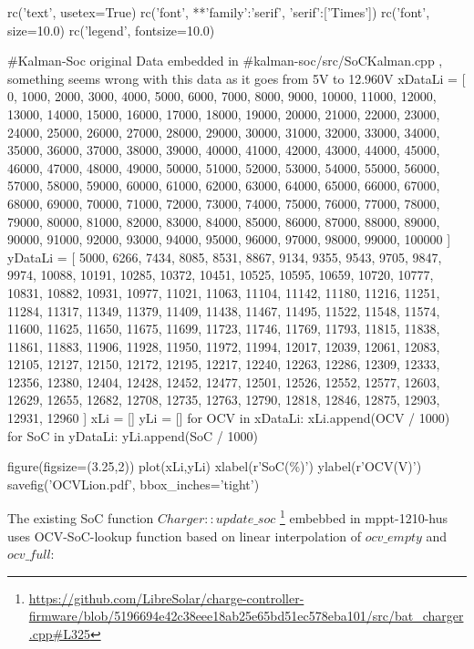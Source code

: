 \begin{pylabcode}[plotsession]
rc('text', usetex=True)
rc('font', **{'family':'serif', 'serif':['Times']})
rc('font', size=10.0)			
rc('legend', fontsize=10.0)


#Kalman-Soc original Data embedded in  
#kalman-soc/src/SoCKalman.cpp , something seems wrong with this data as it goes from 5V to 12.960V  
xDataLi = [ 0, 1000, 2000, 3000, 4000, 5000, 6000, 7000, 8000, 9000, 10000, 11000, 12000, 13000, 14000, 15000, 16000, 17000, 18000, 19000, 20000, 21000, 22000, 23000, 24000, 25000, 26000, 27000, 28000, 29000, 30000, 31000, 32000, 33000, 34000, 35000, 36000, 37000, 38000, 39000, 40000, 41000, 42000, 43000, 44000, 45000, 46000, 47000, 48000, 49000, 50000, 51000, 52000, 53000, 54000, 55000, 56000, 57000, 58000, 59000, 60000, 61000, 62000, 63000, 64000, 65000, 66000, 67000, 68000, 69000, 70000, 71000, 72000, 73000, 74000, 75000, 76000, 77000, 78000, 79000, 80000, 81000, 82000, 83000, 84000, 85000, 86000, 87000, 88000, 89000, 90000, 91000, 92000, 93000, 94000, 95000, 96000, 97000, 98000, 99000, 100000 ]
yDataLi = [ 5000, 6266, 7434, 8085, 8531, 8867, 9134, 9355, 9543, 9705, 9847, 9974, 10088, 10191, 10285, 10372, 10451, 10525, 10595, 10659, 10720, 10777, 10831, 10882, 10931, 10977, 11021, 11063, 11104, 11142, 11180, 11216, 11251, 11284, 11317, 11349, 11379, 11409, 11438, 11467, 11495, 11522, 11548, 11574, 11600, 11625, 11650, 11675, 11699, 11723, 11746, 11769, 11793, 11815, 11838, 11861, 11883, 11906, 11928, 11950, 11972, 11994, 12017, 12039, 12061, 12083, 12105, 12127, 12150, 12172, 12195, 12217, 12240, 12263, 12286, 12309, 12333, 12356, 12380, 12404, 12428, 12452, 12477, 12501, 12526, 12552, 12577, 12603, 12629, 12655, 12682, 12708, 12735, 12763, 12790, 12818, 12846, 12875, 12903, 12931, 12960 ]
xLi = []
yLi = []
for OCV in xDataLi:
    xLi.append(OCV / 1000)
for SoC in yDataLi:
    yLi.append(SoC / 1000)
    
 
figure(figsize=(3.25,2))
plot(xLi,yLi)
xlabel(r'SoC(\%)')
ylabel(r'OCV(V)')
savefig('OCVLion.pdf', bbox_inches='tight')
\end{pylabcode}



\pagebreak

The existing SoC function $Charger::update\_soc$ \footnote{\url{https://github.com/LibreSolar/charge-controller-firmware/blob/5196694e42c38eee18ab25e65bd51ec578eba101/src/bat_charger.cpp\#L325}} embebbed in mppt-1210-hus uses OCV-SoC-lookup function based on linear interpolation of 
$ocv\_empty$ and $ocv\_full$:



